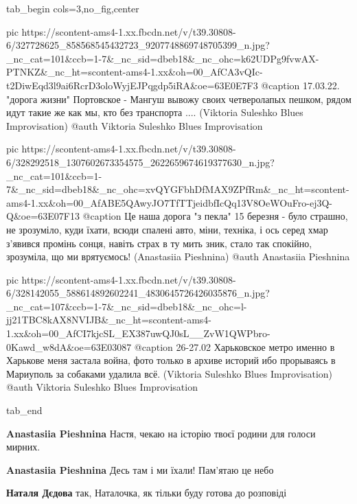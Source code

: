  
 
 
 
 


\ifcmt
  tab_begin cols=3,no_fig,center

     pic https://scontent-ams4-1.xx.fbcdn.net/v/t39.30808-6/327728625_858568545432723_9207748869748705399_n.jpg?_nc_cat=101&ccb=1-7&_nc_sid=dbeb18&_nc_ohc=k62UDPg9fvwAX-PTNKZ&_nc_ht=scontent-ams4-1.xx&oh=00_AfCA3vQIc-t2DiwEqd3l9ai6RcrD3oloWyjEJPqgdp5iRA&oe=63E0E7F3
     @caption 17.03.22. "дорога жизни" Портовское - Мангуш вывожу своих четверолапых пешком, рядом идут такие же как мы, кто без транспорта .... (Viktoria Suleshko Blues Improvisation)
     @auth Viktoria Suleshko Blues Improvisation

     pic https://scontent-ams4-1.xx.fbcdn.net/v/t39.30808-6/328292518_1307602673354575_2622659674619377630_n.jpg?_nc_cat=101&ccb=1-7&_nc_sid=dbeb18&_nc_ohc=xvQYGFbhDfMAX9ZPfRm&_nc_ht=scontent-ams4-1.xx&oh=00_AfABE5QAwyJO7TfTTjeidbfIcQq13V8OeWOuFro-ej3Q-Q&oe=63E07F13
     @caption Це наша дорога "з пекла" 15 березня - було страшно, не зрозуміло, куди їхати, всюди спалені авто, міни, техніка, і ось серед хмар з'явився промінь сонця, навіть страх в ту мить зник, стало так спокійно, зрозуміла, що ми врятуємось! (Anastasiia Pieshnina)
     @auth Anastasiia Pieshnina

     pic https://scontent-ams4-1.xx.fbcdn.net/v/t39.30808-6/328142055_588614892602241_4830645726426035876_n.jpg?_nc_cat=107&ccb=1-7&_nc_sid=dbeb18&_nc_ohc=l-jj21TBC8kAX8NVIJB&_nc_ht=scontent-ams4-1.xx&oh=00_AfCI7kjcSL_EX387uwQJ0sL__ZvW1QWPbro-0Kawd_w8dA&oe=63E03087
     @caption 26-27.02 Харьковское метро именно в Харькове меня застала война, фото только в архиве историй ибо прорываясь в Мариуполь за собаками удалила всё. (Viktoria Suleshko Blues Improvisation)
     @auth Viktoria Suleshko Blues Improvisation

  tab_end
\fi

\begin{itemize} %
\textbf{Anastasiia Pieshnina} Настя, чекаю на історію твоєї родини для голоси мирних.

\textbf{Anastasiia Pieshnina} Десь там і ми їхали! Пам'ятаю це небо🙌

\textbf{Наталя Дєдова} так, Наталочка, як тільки буду готова до розповіді
\end{itemize} %

